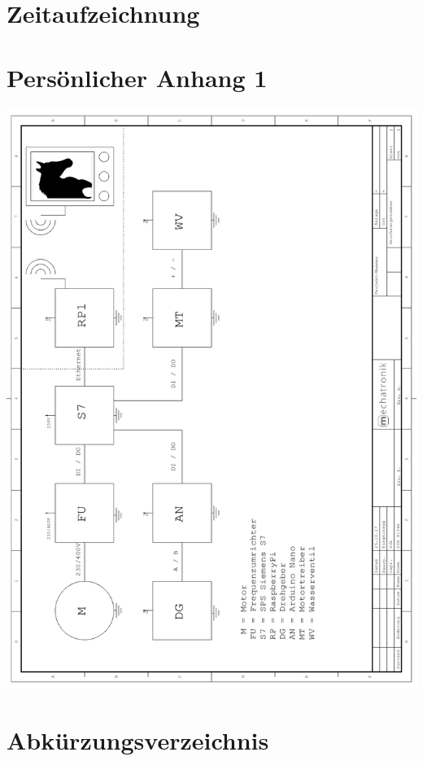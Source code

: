\renewcommand\appendixname{Anhang}
\renewcommand\appendixpagename{Anhang}
\renewcommand\appendixtocname{Anhang}

\lohead{}

\appendix
\begingroup
\makeatletter
\let\ps@plain\ps@empty
\appendixpage
\makeatother
\endgroup

\chapter{Zeitaufzeichnung}
\chapter{Persönlicher Anhang 1}
\label{cha:anhang}

\includegraphics[scale=0.86]{fig/Blockschaltbild1}

\markboth{}{}	%




\chapter{Abkürzungsverzeichnis}
\begin{acronym}
\end{acronym}

\listoffigures
\listoftables
\lstlistoflistings